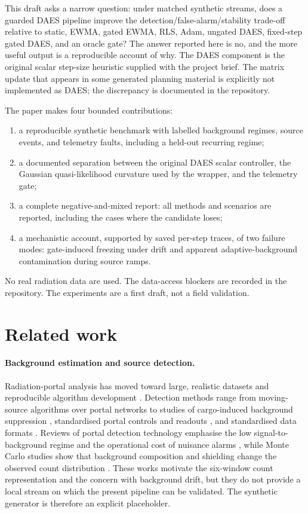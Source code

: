 \documentclass[11pt]{article}
\begin{document}
This draft asks a narrow question: under matched synthetic streams, does a guarded DAES pipeline improve the detection/false-alarm/stability trade-off relative to static, EWMA, gated EWMA, RLS, Adam, ungated DAES, fixed-step gated DAES, and an oracle gate? The answer reported here is no, and the more useful output is a reproducible account of why. The DAES component is the original scalar step-size heuristic supplied with the project brief. The matrix update that appears in some generated planning material is explicitly not implemented as DAES; the discrepancy is documented in the repository.

The paper makes four bounded contributions:
\begin{enumerate}
  \item a reproducible synthetic benchmark with labelled background regimes, source events, and telemetry faults, including a held-out recurring regime;
  \item a documented separation between the original DAES scalar controller, the Gaussian quasi-likelihood curvature used by the wrapper, and the telemetry gate;
  \item a complete negative-and-mixed report: all methods and scenarios are reported, including the cases where the candidate loses;
  \item a mechanistic account, supported by saved per-step traces, of two failure modes: gate-induced freezing under drift and apparent adaptive-background contamination during source ramps.
\end{enumerate}

No real radiation data are used. The data-access blockers are recorded in the repository. The experiments are a first draft, not a field validation.

\section{Related work}

\paragraph{Background estimation and source detection.}
Radiation-portal analysis has moved toward large, realistic datasets and reproducible algorithm development \citep{ghawaly2020data,ghawaly2026radai}. Detection methods range from moving-source algorithms over portal networks \citep{coulon2014moving} to studies of cargo-induced background suppression \citep{sim2024cargo}, standardised portal controls and readouts \citep{tinker2010standardisation}, and standardised data formats \citep{bae2025format}. Reviews of portal detection technology emphasise the low signal-to-background regime and the operational cost of nuisance alarms \citep{runkle2009photon}, while Monte Carlo studies show that background composition and shielding change the observed count distribution \citep{sim2021background}. These works motivate the six-window count representation and the concern with background drift, but they do not provide a local stream on which the present pipeline can be validated. The synthetic generator is therefore an explicit placeholder.
\end{document}
